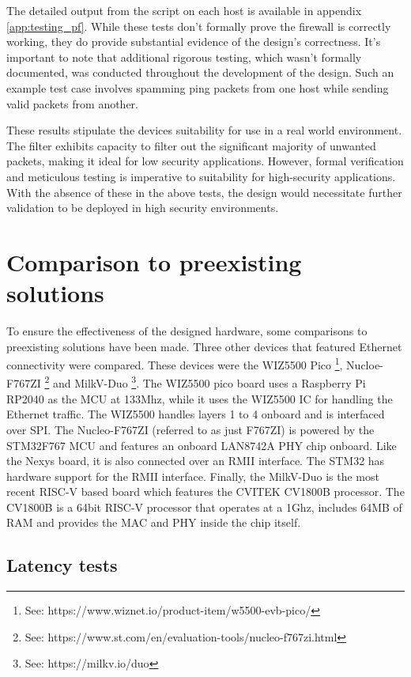 The detailed output from the script on each host is available in appendix \ref{app:testing_pf}. While these tests don't formally prove the firewall is correctly working, they do provide substantial evidence of the design's correctness. It's important to note that additional rigorous testing, which wasn't formally documented, was conducted throughout the development of the design. Such an example test case involves spamming ping packets from one host while sending valid packets from another. 

These results stipulate the devices suitability for use in a real world environment. The filter exhibits capacity to filter out the significant majority of unwanted packets, making it ideal for low security applications. However, formal verification and meticulous testing is imperative to suitability for high-security applications. With the absence of these in the above tests, the design would necessitate further validation to be deployed in high security environments. 





\section{Comparison to preexisting solutions}

To ensure the effectiveness of the designed hardware, some comparisons to preexisting solutions have been made. Three other devices that featured Ethernet connectivity were compared. These devices were the WIZ5500 Pico \footnote[1]{See: https://www.wiznet.io/product-item/w5500-evb-pico/}, Nucloe-F767ZI \footnote[2]{See: https://www.st.com/en/evaluation-tools/nucleo-f767zi.html} and MilkV-Duo \footnote[3]{See: https://milkv.io/duo}. The WIZ5500 pico board uses a Raspberry Pi RP2040 as the MCU at 133Mhz, while it uses the WIZ5500 IC for handling the Ethernet traffic. The WIZ5500 handles layers 1 to 4 onboard and is interfaced over SPI. The Nucleo-F767ZI (referred to as just F767ZI) is powered by the STM32F767 MCU and features an onboard LAN8742A PHY chip onboard. Like the Nexys board, it is also connected over an RMII interface. The STM32 has hardware support for the RMII interface. Finally, the MilkV-Duo is the most recent RISC-V based board which features the CVITEK CV1800B processor. The CV1800B is a 64bit RISC-V processor that operates at a 1Ghz, includes 64MB of RAM and provides the MAC and PHY inside the chip itself.

\subsection{Latency tests}


